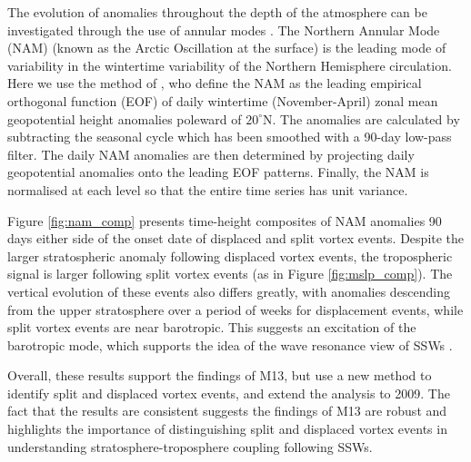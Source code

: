 The evolution of anomalies throughout the depth of the atmosphere can be
investigated through the use of annular modes \citep[e.g.][]{Baldwin2001a}. The
Northern Annular Mode (NAM) (known as the Arctic Oscillation at the surface) is
the leading mode of variability in the wintertime variability of the Northern
Hemisphere circulation. Here we use the method of \citep{Baldwin2009}, who
define the NAM as the leading empirical orthogonal function (EOF) of daily
wintertime (November-April) zonal mean geopotential height anomalies poleward of
$20^{\circ}$N. The anomalies are calculated by subtracting the seasonal cycle
which has been smoothed with a 90-day low-pass filter. The daily NAM anomalies
are then determined by projecting daily geopotential anomalies onto the leading
EOF patterns. Finally, the NAM is normalised at each level so that the entire
time series has unit variance.

Figure \ref{fig:nam_comp} presents time-height composites of NAM anomalies 90
days either side of the onset date of displaced and split vortex events. Despite
the larger stratospheric anomaly following displaced vortex events, the
tropospheric signal is larger following split vortex events (as in Figure
\ref{fig:mslp_comp}). The vertical evolution of these events also differs
greatly, with anomalies descending from the upper stratosphere over a period of
weeks for displacement events, while split vortex events are near
barotropic. This suggests an excitation of the barotropic mode, which supports
the idea of the wave resonance view of SSWs \citep{Esler2005}.

Overall, these results support the findings of M13, but use a new method to
identify split and displaced vortex events, and extend the analysis to 2009. The
fact that the results are consistent suggests the findings of M13 are robust and
highlights the importance of distinguishing split and displaced vortex events in
understanding stratosphere-troposphere coupling following SSWs.






